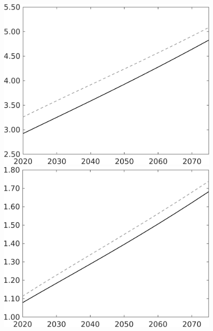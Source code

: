 \documentclass[12pt]{article}
\begin{document}
\begin{figure}[h!!]
\begin{minipage}[]{0.32\textwidth}
	\end{minipage}	
	\begin{minipage}[]{0.32\textwidth}
		\includegraphics[width=1\textwidth]{../../codding_model/own_basedOnFried/optimalPol_010922_revision/figures/all_13Sept22/LevTaufNoTauf_TaulCalib_Equlab_regime0_wh_spillover0_nsk1_xgr0_knspil1_sep1_LFlimit0_emsbase0_countec0_GovRev0_etaa0.79_lgd0.png}
	\end{minipage}	
	\begin{minipage}[]{0.32\textwidth}
		\includegraphics[width=1\textwidth]{../../codding_model/own_basedOnFried/optimalPol_010922_revision/figures/all_13Sept22/LevTaufNoTauf_TaulCalib_Equlab_regime0_C_spillover0_nsk1_xgr0_knspil1_sep1_LFlimit0_emsbase0_countec0_GovRev0_etaa0.79_lgd0.png}

\end{minipage}
\end{figure}
\end{document}
